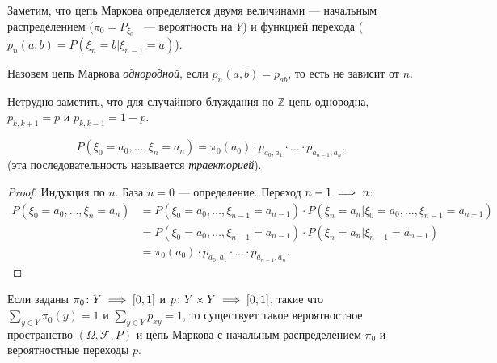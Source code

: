 Заметим, что цепь Маркова определяется двумя величинами --- начальным распределением ($\pi_0 = P_{\xi_0}$ ~--- вероятность на $Y$) и функцией перехода ($p_n(a, b) = P(\xi_n = b | \xi_{n - 1} = a)$).


\begin{definition}
    Назовем цепь Маркова \textit{однородной}, если $p_n(a, b) = p_{ab}$, то есть не зависит от $n$.
\end{definition}

   Нетрудно заметить, что для случайного блуждания по $\mathbb{Z}$ цепь однородна, $p_{k, k + 1} = p$ и $p_{k, k - 1} = 1-p$.

\begin{theorem}
    $$P(\xi_0 = a_0, \ldots, \xi_n = a_n) = \pi_0(a_0)\cdot p_{a_0, a_1}\cdot\ldots\cdot p_{a_{n - 1}, a_n}.$$ (эта последовательность называется \textit{траекторией}).
\end{theorem}

\begin{proof}
    Индукция по $n$.
    База $n=0$ --- определение.
    Переход $n - 1\implies n$:
   \begin{align*}
       P(\xi_0 = a_0, \ldots, \xi_n = a_n) &= P(\xi_0 = a_0 , \ldots, \xi_{n - 1} = a_{n - 1})\cdot P(\xi_n = a_n | \xi_0 = a_0, \ldots, \xi_{n - 1} =
        a_{n - 1}) \\&= P(\xi_0 = a_0 , \ldots, \xi_{n - 1} = a_{n - 1})\cdot P(\xi_n = a_n | \xi_{n - 1} = a_{n - 1})  \\&=
        \pi_0(a_0)\cdot p_{a_0, a_1}\cdot\ldots\cdot p_{a_{n - 1}, a_n}.
   \end{align*}
\end{proof}

\begin{theorem}
    Если заданы $\pi_0\colon Y \implies [0, 1]$ и $p\colon Y\times Y \implies [0,1]$, такие что $\sum_{y\in Y}\pi_0(y) = 1$ и
    $\sum_{y\in Y} p_{xy} = 1$, то существует такое вероятностное пространство $(\Omega, \mathcal{F}, P)$ и цепь Маркова
    с начальным распределением $\pi_0$ и вероятностные переходы $p$.
\end{theorem}
\newpage
